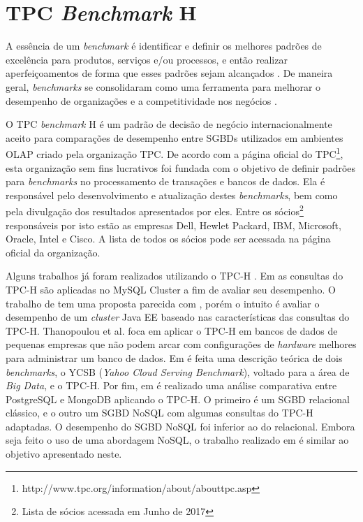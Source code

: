 \chapter{TPC \textit{Benchmark} H}
\label{tpch}

A essência de um \textit{benchmark} é identificar e definir os melhores padrões de excelência para produtos, serviços e/ou processos, e então realizar aperfeiçoamentos de forma que esses padrões sejam alcançados \cite{bhutta1999benchmarking}. De maneira geral, \textit{benchmarks} se consolidaram como uma ferramenta para melhorar o desempenho de organizações e a competitividade nos negócios \cite{kyro2003revising}.

O TPC \textit{\textit{benchmark}} H é um padrão de decisão de negócio internacionalmente aceito para comparações de desempenho entre SGBDs utilizados em ambientes OLAP criado pela organização TPC. De acordo com a página oficial do TPC\footnote{http://www.tpc.org/information/about/abouttpc.asp}, esta organização sem fins lucrativos foi fundada com o objetivo de definir padrões para \textit{benchmarks} no processamento de transações e bancos de dados. Ela é responsável pelo desenvolvimento e atualização destes \textit{benchmarks}, bem como pela divulgação dos resultados apresentados por eles. Entre os sócios\footnote{Lista de sócios acessada em Junho de 2017} responsáveis por isto estão as empresas Dell, Hewlet Packard, IBM, Microsoft, Oracle, Intel e Cisco. A lista de todos os sócios pode ser acessada na página oficial da organização.

Alguns trabalhos já foram realizados utilizando o TPC-H \cite{ngamsuriyaroj2010performance, nadee2012performance, thanopoulou2012benchmarking, barata2014ycsb, rutishauser2012tpc}. Em \cite{ngamsuriyaroj2010performance} as consultas do TPC-H são aplicadas no MySQL Cluster a fim de avaliar seu desempenho. O trabalho de \cite{nadee2012performance} tem uma proposta parecida com \cite{ngamsuriyaroj2010performance}, porém o intuito é avaliar o desempenho de um \textit{cluster} Java EE baseado nas características das consultas do TPC-H. Thanopoulou et al. \cite{thanopoulou2012benchmarking} foca em aplicar o TPC-H em bancos de dados de pequenas empresas que não podem arcar com configurações de \textit{hardware} melhores para administrar um banco de dados. Em \cite{barata2014ycsb} é feita uma descrição teórica de dois \textit{benchmarks}, o YCSB (\textit{Yahoo Cloud Serving Benchmark}), voltado para a área de \textit{Big Data}, e o TPC-H. Por fim, em \cite{rutishauser2012tpc} é realizado uma análise comparativa entre PostgreSQL e MongoDB aplicando o TPC-H. O primeiro é um SGBD relacional clássico, e o outro um SGBD NoSQL com algumas consultas do TPC-H adaptadas. O desempenho do SGBD NoSQL foi inferior ao do relacional. Embora seja feito o uso de uma abordagem NoSQL, o trabalho realizado em \cite{rutishauser2012tpc} é similar ao objetivo apresentado neste.

